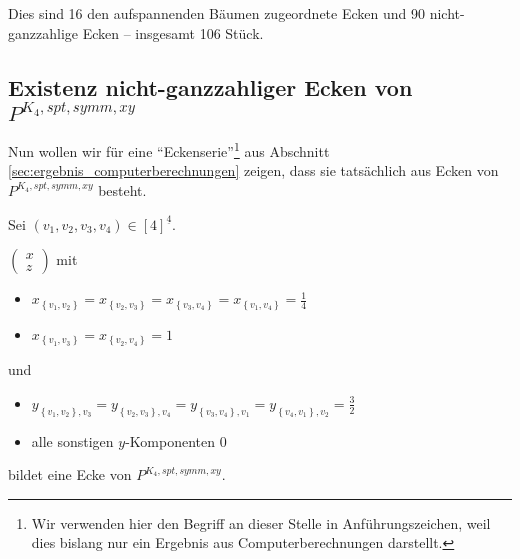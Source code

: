 \documentclass[10p,a4paper,BCOR = 12mm, DIV=15]{scrbook}
\begin{document}
Dies sind 16 den aufspannenden Bäumen zugeordnete Ecken und 90 nicht-ganz\-zahlige Ecken -- insgesamt 106 Stück.

\subsection{Existenz nicht-ganzzahliger Ecken von $P^{K_4, spt, symm, xy}$}

Nun wollen wir für eine  "`Eckenserie"'\footnote{Wir verwenden hier den Begriff an dieser Stelle in Anführungszeichen, weil dies bislang nur ein Ergebnis aus Computerberechnungen darstellt.} aus Abschnitt \ref{sec:ergebnis_computerberechnungen} zeigen, dass sie tatsächlich aus Ecken von $P^{K_4, spt, symm, xy}$ besteht.

\begin{Sa}
\label{sa:nichtganzz_ecke_P^xy}
Sei $\left(v_1, v_2, v_3, v_4\right) \in \left[4\right]^{\underline{4}}$.

$
\left(\begin{array}{c}
x \\
z
\end{array}\right)
$ mit
\begin{itemize}
\item $x_{\left\{v_1, v_2\right\}} = x_{\left\{v_2, v_3\right\}} = x_{\left\{v_3, v_4\right\}} = x_{\left\{v_1, v_4\right\}} = \frac{1}{4}$
\item $x_{\left\{v_1, v_3\right\}} = x_{\left\{v_2, v_4\right\}} = 1$
\end{itemize}
und
\begin{itemize}
\item  $y_{\left\{v_1, v_2\right\}, v_3} = y_{\left\{v_2, v_3\right\}, v_4} = y_{\left\{v_3, v_4\right\}, v_1} = y_{\left\{v_4, v_1\right\}, v_2} = \frac{3}{2}$
\item alle sonstigen $y$-Komponenten $0$
\end{itemize}
bildet eine Ecke von $P^{K_4, spt, symm, xy}$.
\end{Sa}
\end{document}
